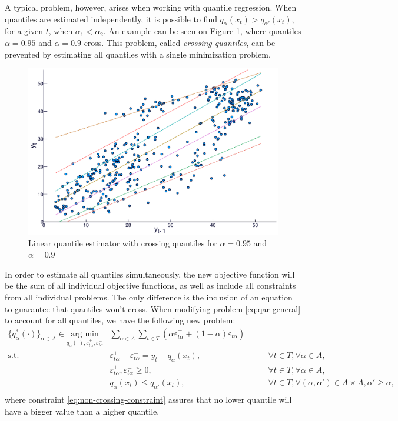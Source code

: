 A typical problem, however, arises when working with quantile regression. When quantiles are estimated independently, it is possible to find $q_{\alpha}(x_t) > q_{\alpha'}(x_t)$, for a given $t$, when $\alpha_1 < \alpha_2$. An example can be seen on Figure \ref{fig:crossing-quantiles}, where quantiles $\alpha = 0.95$ and $\alpha = 0.9$ cross. This problem, called \textit{crossing quantiles}, can be prevented by estimating all quantiles with a single minimization problem.
\begin{figure}
	\centering
	\includegraphics[width=0.6\linewidth]{./Figuras/regressao-quantilica/icaraizinho-quantile-linear-scatter-crossing}
	\caption{Linear quantile estimator with crossing quantiles for $\alpha = 0.95$ and $\alpha = 0.9$}
	\label{fig:crossing-quantiles}
\end{figure}

In order to estimate all quantiles simultaneously, the new objective function will be the sum of all individual objective functions, as well as include all constraints from all individual problems. The only difference is the inclusion of an equation to guarantee that quantiles won't cross.  When modifying problem \ref{eq:qar-general} to account for all quantiles, we have the following new problem:
\begin{eqnarray}
\label{eq:non-crossing-quantiles1}
\{q^*_{\alpha}(\cdot)\}_{\alpha \in A}  \in \underset{q_\alpha(\cdot),\varepsilon_{t \alpha}^{+}, \varepsilon_{t \alpha}^-}{\text{arg min}} &  \sum_{\alpha \in A} \sum_{t \in T}\left(\alpha \varepsilon_{t \alpha}^++(1-\alpha)\varepsilon_{t \alpha}^{-}\right) &  \\
\mbox{s.t. } & \varepsilon_{t \alpha}^{+}-\varepsilon_{t \alpha}^{-}=y_{t}-q_\alpha(x_{t}), & \qquad\forall t \in T,\forall \alpha \in A,\\
& \varepsilon_{t \alpha}^+,\varepsilon_{t \alpha}^- \geq 0, & \qquad\forall t \in T,\forall \alpha \in A,\\\label{eq:non-crossing-constraint}
& q_{\alpha}(x_t) \leq q_{\alpha'}(x_t), & \qquad \forall t \in T, \forall (\alpha, \alpha') \in A \times A,  \alpha' \geq \alpha,\nonumber\\
\end{eqnarray}
where constraint \ref{eq:non-crossing-constraint} assures that no lower quantile will have a bigger value than a higher quantile.




